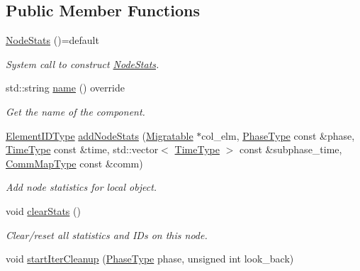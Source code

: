 \subsection*{Public Member Functions}
\begin{DoxyCompactItemize}
\item 
\hyperlink{structvt_1_1vrt_1_1collection_1_1balance_1_1_node_stats_a05936543d7f0f41a55c77fe5265ca8ed}{Node\+Stats} ()=default
\begin{DoxyCompactList}\small\item\em System call to construct {\ttfamily \hyperlink{structvt_1_1vrt_1_1collection_1_1balance_1_1_node_stats}{Node\+Stats}}. \end{DoxyCompactList}\item 
std\+::string \hyperlink{structvt_1_1vrt_1_1collection_1_1balance_1_1_node_stats_adfd9b278e017ccc02ed418c8f46bea2c}{name} () override
\begin{DoxyCompactList}\small\item\em Get the name of the component. \end{DoxyCompactList}\item 
\hyperlink{namespacevt_1_1vrt_1_1collection_1_1balance_a14c8d2c972f2913aa3f1636e5be0a120}{Element\+I\+D\+Type} \hyperlink{structvt_1_1vrt_1_1collection_1_1balance_1_1_node_stats_ae4d6db216e4c26de96a367499373a0a5}{add\+Node\+Stats} (\hyperlink{structvt_1_1vrt_1_1collection_1_1_migratable}{Migratable} $\ast$col\+\_\+elm, \hyperlink{namespacevt_a46ce6733d5cdbd735d561b7b4029f6d7}{Phase\+Type} const \&phase, \hyperlink{namespacevt_a876a9d0cd5a952859c72de8a46881442}{Time\+Type} const \&time, std\+::vector$<$ \hyperlink{namespacevt_a876a9d0cd5a952859c72de8a46881442}{Time\+Type} $>$ const \&subphase\+\_\+time, \hyperlink{namespacevt_1_1vrt_1_1collection_1_1balance_a10860c956804d644db54a16012352728}{Comm\+Map\+Type} const \&comm)
\begin{DoxyCompactList}\small\item\em Add node statistics for local object. \end{DoxyCompactList}\item 
void \hyperlink{structvt_1_1vrt_1_1collection_1_1balance_1_1_node_stats_a99adbf5c5165b274dd5abd761ed72c45}{clear\+Stats} ()
\begin{DoxyCompactList}\small\item\em Clear/reset all statistics and I\+Ds on this node. \end{DoxyCompactList}\item 
void \hyperlink{structvt_1_1vrt_1_1collection_1_1balance_1_1_node_stats_ae76790d41701769b86ef15e4924d661d}{start\+Iter\+Cleanup} (\hyperlink{namespacevt_a46ce6733d5cdbd735d561b7b4029f6d7}{Phase\+Type} phase, unsigned int look\+\_\+back)

\end{DoxyCompactItemize}

